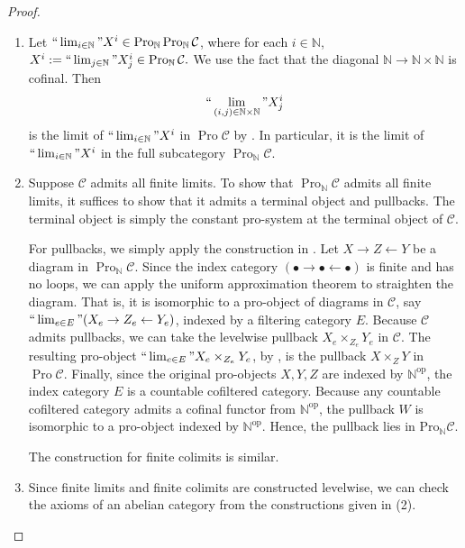 \documentclass[11pt]{amsart}
\newcommand{\ra}{\rightarrow} %
\newcommand{\N}{\mathbb{N}}
\newcommand{\cC}{\mathcal{C}} %
\newcommand{\op}{{\operatorname{op}}}
\renewcommand{\lim}{\operatornamewithlimits{\rm{lim}}}
\newcommand{\Pro}{\operatorname{Pro}}
\theoremstyle{plain}
\theoremstyle{definition}
\numberwithin{equation}{prop}
\begin{document}
\begin{proof}
\begin{enumerate}
\item 
Let $``\lim_{i\in \N}"X^i\in \Pro_{\N}\Pro_{\N}\cC$, where for each $i\in \N$, $X^i:=``\lim_{j\in \N}"X^i_j\in \Pro_{\N}\cC.$
We use the fact that the diagonal $\N\ra \N\times \N$ is cofinal.
Then $$``\lim_{(i,j)\in \N\times \N}"X^i_j$$ is the limit of $``\lim_{i\in \N}"X^i$ in $\Pro\cC$ by \cite[A. Proposition 4.4]{AM}.
In particular, it is the limit of $``\lim_{i\in \N}"X^i$ in the full subcategory $\Pro_{\N}\cC$.
\item 
Suppose $\cC$ admits all finite limits. To show that $\Pro_{\N} \cC$ admits all finite limits, it suffices to show that it admits a terminal object and pullbacks. 
The terminal object is simply the constant pro-system at the terminal object of $\cC$.

For pullbacks, we simply apply the construction in \cite[Proposition 4.2]{AM}.
Let $X \to Z \leftarrow Y$ be a diagram in $\Pro_{\N} \cC$. 
Since the index category $(\bullet \to \bullet \leftarrow \bullet)$ is finite and has no loops, 
we can apply the uniform approximation theorem \cite[A. Proposition 3.3]{AM} to straighten the diagram.
That is, it is isomorphic to a pro-object of diagrams in $\mathcal{C}$, say $``\lim_{e\in E}"(X_e \to Z_e \leftarrow Y_e)$, 
indexed by a filtering category $E$. 
Because $\mathcal{C}$ admits pullbacks, 
we can take the levelwise pullback $ X_e \times_{Z_e} Y_e$ in $\mathcal{C}$. 
The resulting pro-object $``\lim_{e\in E}" X_e \times_{Z_e} Y_e$,
by  \cite[Proposition 4.1]{AM},
is the pullback $X \times_Z Y$ in $\Pro\mathcal{C}$. 
Finally, since the original pro-objects $X, Y, Z$ are indexed by $\mathbb{N}^{\text{op}}$, 
the index category $E$ is a countable cofiltered category. 
Because any countable cofiltered category admits a cofinal functor from $\N^{\op}$, the pullback $W$ is isomorphic to a pro-object indexed by $\mathbb{N}^{\text{op}}$. 
Hence, the pullback lies in $\text{Pro}_{\mathbb{N}}\mathcal{C}$. 

The construction for finite colimits is similar. 
\item 
Since finite limits and finite colimits are constructed levelwise, we can check the axioms of an abelian category from the constructions given in (2).
\end{enumerate}
\end{proof}
\end{document}
